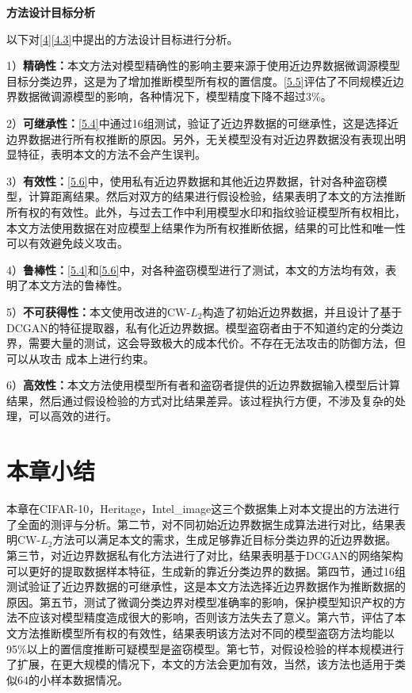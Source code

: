 \textbf{方法设计目标分析}

以下对\ref{4}\ref{4.3}中提出的方法设计目标进行分析。

1）\textbf{精确性：}本文方法对模型精确性的影响主要来源于使用近边界数据微调源模型目标分类边界，这是为了增加推断模型所有权的置信度。\ref{5.5}评估了不同规模近边界数据微调源模型的影响，各种情况下，模型精度下降不超过3\%。

2）\textbf{可继承性：}\ref{5.4}中通过16组测试，验证了近边界数据的可继承性，这是选择近边界数据进行所有权推断的原因。另外，无关模型没有对近边界数据没有表现出明显特征，表明本文的方法不会产生误判。

3）\textbf{有效性：}\ref{5.6}中，使用私有近边界数据和其他近边界数据，针对各种盗窃模型，计算距离结果。然后对双方的结果进行假设检验，结果表明了本文的方法推断所有权的有效性。此外，与过去工作中利用模型水印和指纹验证模型所有权相比，本文方法使用数据在对应模型上结果作为所有权推断依据，结果的可比性和唯一性可以有效避免歧义攻击。

4）\textbf{鲁棒性：}\ref{5.4}和\ref{5.6}中，对各种盗窃模型进行了测试，本文的方法均有效，表明了本文方法的鲁棒性。

5）\textbf{不可获得性：}本文使用改进的CW-$L_2$构造了初始近边界数据，并且设计了基于DCGAN的特征提取器，私有化近边界数据。模型盗窃者由于不知道约定的分类边界，需要大量的测试，这会导致极大的成本代价。不存在无法攻击的防御方法，但可以从攻击
成本上进行约束。

6）\textbf{高效性：}本文方法使用模型所有者和盗窃者提供的近边界数据输入模型后计算结果，然后通过假设检验的方式对比结果差异。该过程执行方便，不涉及复杂的处理，可以高效的进行。

\section{本章小结}

本章在CIFAR-10，Heritage，Intel\_image这三个数据集上对本文提出的方法进行了全面的测评与分析。第二节，对不同初始近边界数据生成算法进行对比，结果表明CW-$L_2$方法可以满足本文的需求，生成足够靠近目标分类边界的近边界数据。第三节，对近边界数据私有化方法进行了对比，结果表明基于DCGAN的网络架构可以更好的提取数据样本特征，生成新的靠近分类边界的数据。第四节，通过16组测试验证了近边界数据的可继承性，这是本文方法选择近边界数据作为推断数据的原因。第五节，测试了微调分类边界对模型准确率的影响，保护模型知识产权的方法不应该对模型精度造成很大的影响，否则该方法失去了意义。第六节，评估了本文方法推断模型所有权的有效性，结果表明该方法对不同的模型盗窃方法均能以95\%以上的置信度推断可疑模型是盗窃模型。第七节，对假设检验的样本规模进行了扩展，在更大规模的情况下，本文的方法会更加有效，当然，该方法也适用于类似64的小样本数据情况。
